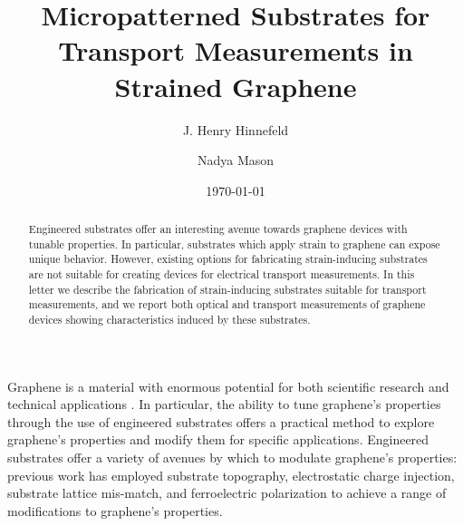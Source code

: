 \documentclass[%
 aip,
 apl,%
 amsmath,amssymb,
 reprint,%
]{revtex4-1}
\begin{document}

\title[Micropatterned Substrates for Transport Measurements in Strained Graphene]{Micropatterned Substrates for Transport Measurements in Strained Graphene}

\author{J. Henry Hinnefeld}
\author{Nadya Mason}
 
\date{\today}

\begin{abstract}
Engineered substrates offer an interesting avenue towards graphene devices with tunable properties.
In particular, substrates which apply strain to graphene can expose unique behavior.
However, existing options for fabricating strain-inducing substrates are not suitable for creating 
devices for electrical transport measurements.
In this letter we describe the fabrication of strain-inducing substrates suitable for transport measurements,
and we report both optical and transport measurements of graphene devices showing characteristics induced by these substrates.
\end{abstract}


\maketitle




Graphene is a material with enormous potential for both scientific research and technical applications
\cite{novoselov2004electric,novoselov2005two,zhang2005experimental,geim2007rise}.
In particular, the ability to tune graphene's properties through the use of engineered substrates offers a practical
method to explore graphene's properties and modify them for specific applications\cite{guinea2010energy, zhou2007substrate}.
Engineered substrates offer a variety of avenues by which to modulate graphene's properties:
previous work has employed substrate topography\cite{Tomori2011},
electrostatic charge injection\cite{chiu2010controllable},
substrate lattice mis-match\cite{zhou2007substrate},
and ferroelectric polarization\cite{hinnefeld2016single}
to achieve a range of modifications to graphene's properties.
\end{document}
